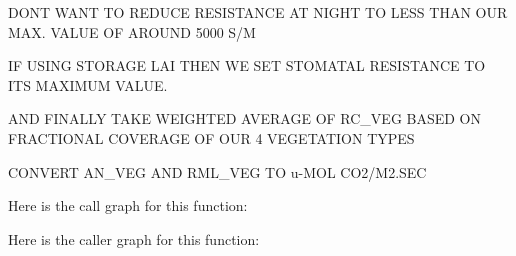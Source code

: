 D\+O\+N\textquotesingle{}T W\+A\+N\+T T\+O R\+E\+D\+U\+C\+E R\+E\+S\+I\+S\+T\+A\+N\+C\+E A\+T N\+I\+G\+H\+T T\+O L\+E\+S\+S T\+H\+A\+N O\+U\+R M\+A\+X. V\+A\+L\+U\+E O\+F A\+R\+O\+U\+N\+D 5000 S/\+M

I\+F U\+S\+I\+N\+G S\+T\+O\+R\+A\+G\+E L\+A\+I T\+H\+E\+N W\+E S\+E\+T S\+T\+O\+M\+A\+T\+A\+L R\+E\+S\+I\+S\+T\+A\+N\+C\+E T\+O I\+T\+S M\+A\+X\+I\+M\+U\+M V\+A\+L\+U\+E.

A\+N\+D F\+I\+N\+A\+L\+L\+Y T\+A\+K\+E W\+E\+I\+G\+H\+T\+E\+D A\+V\+E\+R\+A\+G\+E O\+F R\+C\+\_\+\+V\+E\+G B\+A\+S\+E\+D O\+N F\+R\+A\+C\+T\+I\+O\+N\+A\+L C\+O\+V\+E\+R\+A\+G\+E O\+F O\+U\+R 4 V\+E\+G\+E\+T\+A\+T\+I\+O\+N T\+Y\+P\+E\+S

C\+O\+N\+V\+E\+R\+T A\+N\+\_\+\+V\+E\+G A\+N\+D R\+M\+L\+\_\+\+V\+E\+G T\+O u-\/\+M\+O\+L C\+O2/\+M2.\+S\+E\+C

Here is the call graph for this function\+:




Here is the caller graph for this function\+:


